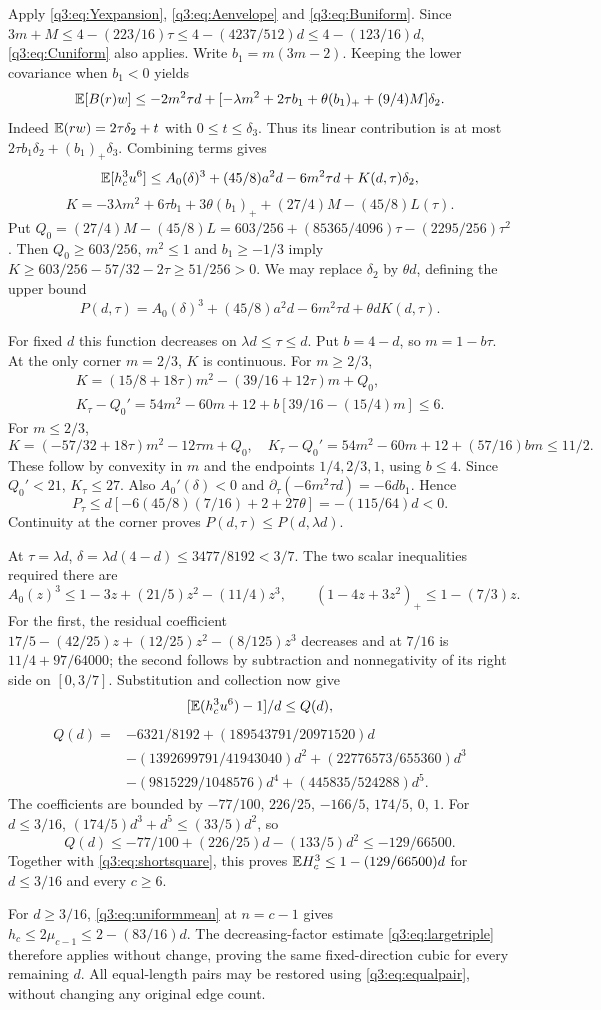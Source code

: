 Apply \eqref{q3:eq:Yexpansion}, \eqref{q3:eq:Aenvelope} and \eqref{q3:eq:Buniform}.
Since $3m+M\le4-(223/16)\tau\le4-(4237/512)d\le4-(123/16)d$, \eqref{q3:eq:Cuniform} also applies. Write $b_1=m(3m-2)$. Keeping the lower covariance when $b_1<0$ yields
\[
 \mathbb E[B(r)w]\le-2m^2\tau d+
 [-\lambda m^2+2\tau b_1+\theta(b_1)_++(9/4)M]\delta_{2} .
\]
Indeed $\mathbb E(rw)=2\tau \delta_{2}+t$ with $0\le t\le \delta_{3}$. Thus its linear contribution is at most $2\tau b_1\delta_{2}+(b_1)_+\delta_{3}$. Combining terms gives
\[
 \mathbb E[h_c^3u^6]\le A_0(\delta)^3+(45/8)a^2d-6m^2\tau d+K(d,\tau)\delta_{2},
\]
\[
 K=-3\lambda m^2+6\tau b_1+3\theta(b_1)_+
       +(27/4)M-(45/8)L(\tau).
\]
Put $Q_0=(27/4)M-(45/8)L
=603/256+(85365/4096)\tau-(2295/256)\tau^2$.
Then $Q_0\ge603/256$, $m^2\le1$ and $b_1\ge-1/3$ imply
$K\ge603/256-57/32-2\tau\ge51/256>0$.
We may replace $\delta_{2}$ by $\theta d$, defining the upper bound
\[
 P(d,\tau)=A_0(\delta)^3+(45/8)a^2d-6m^2\tau d+\theta dK(d,\tau).
\]

For fixed $d$ this function decreases on $\lambda d\le\tau\le d$.
Put $b=4-d$, so $m=1-b\tau$. At the only corner $m=2/3$, $K$ is continuous.
For $m\ge2/3$,
\[
 \begin{gathered}
 K=(15/8+18\tau)m^2-(39/16+12\tau)m+Q_0,\\
 K_\tau-Q_0'=54m^2-60m+12+b[39/16-(15/4)m]\le6 .
 \end{gathered}
\]
For $m\le2/3$,
\[
 K=(-57/32+18\tau)m^2-12\tau m+Q_0,\quad
 K_\tau-Q_0'=54m^2-60m+12+(57/16)bm\le11/2 .
\]
These follow by convexity in $m$ and the endpoints $1/4,2/3,1$, using $b\le4$.
Since $Q_0'<21$, $K_\tau\le27$. Also $A_0'(\delta)<0$ and
$\partial_\tau(-6m^2\tau d)=-6db_1$. Hence
\[
 P_\tau\le d[-6(45/8)(7/16)+2+27\theta]=-(115/64)d<0 .
\]
Continuity at the corner proves $P(d,\tau)\le P(d,\lambda d)$.

At $\tau=\lambda d$, $\delta=\lambda d(4-d)\le3477/8192<3/7$.
The two scalar inequalities required there are
\[
 A_0(z)^3\le1-3z+(21/5)z^2-(11/4)z^3,\qquad
 (1-4z+3z^2)_+\le1-(7/3)z .
\]
For the first, the residual coefficient
$17/5-(42/25)z+(12/25)z^2-(8/125)z^3$ decreases and at $7/16$ is
$11/4+97/64000$; the second follows by subtraction and nonnegativity of its right side on $[0,3/7]$.
Substitution and collection now give
\[
 [\mathbb E(h_c^3u^6)-1]/d\le Q(d),
\]
\[
\begin{split}
 Q(d)={}&-6321/8192+(189543791/20971520)d\\
 &-(1392699791/41943040)d^2+(22776573/655360)d^3\\
 &-(9815229/1048576)d^4+(445835/524288)d^5.
\end{split}
\]
The coefficients are bounded by $-77/100$, $226/25$, $-166/5$, $174/5$, $0$, $1$.
For $d\le3/16$, $(174/5)d^3+d^5\le(33/5)d^2$, so
\[
 Q(d)\le-77/100+(226/25)d-(133/5)d^2\le-129/66500 .
\]
Together with \eqref{q3:eq:shortsquare}, this proves
$\mathbb E H_c^3\le1-(129/66500)d$ for $d\le3/16$ and every $c\ge6$.

For $d\ge3/16$, \eqref{q3:eq:uniformmean} at $n=c-1$ gives
$h_c\le2\mu_{c-1}\le2-(83/16)d$. The decreasing-factor estimate
\eqref{q3:eq:largetriple} therefore applies without change, proving the same fixed-direction cubic for every remaining $d$.
All equal-length pairs may be restored using \eqref{q3:eq:equalpair}, without changing any original edge count.
